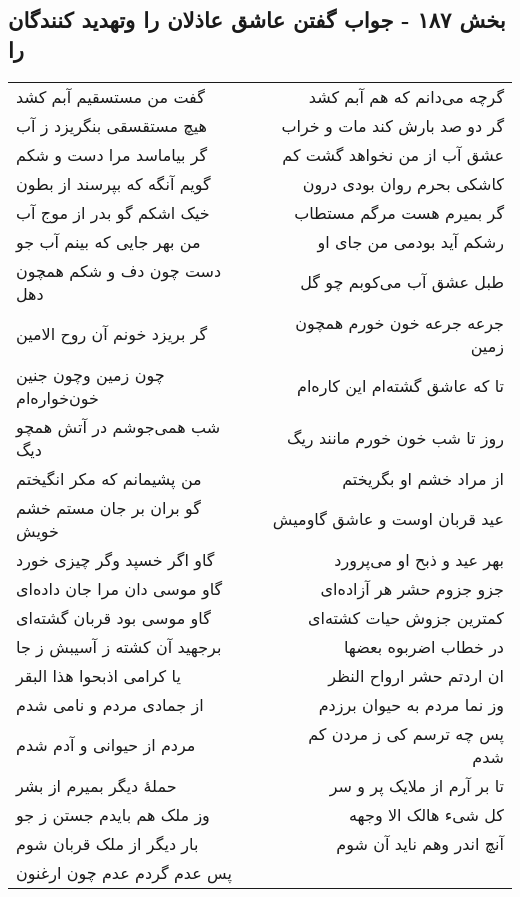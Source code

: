 \begin{center}
\section*{بخش ۱۸۷ - جواب گفتن عاشق عاذلان را وتهدید کنندگان را}
\label{sec:sh187}
\begin{longtable}{l p{0.5cm} r}
گفت من مستسقیم آبم کشد
&&
گرچه می‌دانم که هم آبم کشد
\\
هیچ مستقسقی بنگریزد ز آب
&&
گر دو صد بارش کند مات و خراب
\\
گر بیاماسد مرا دست و شکم
&&
عشق آب از من نخواهد گشت کم
\\
گویم آنگه که بپرسند از بطون
&&
کاشکی بحرم روان بودی درون
\\
خیک اشکم گو بدر از موج آب
&&
گر بمیرم هست مرگم مستطاب
\\
من بهر جایی که بینم آب جو
&&
رشکم آید بودمی من جای او
\\
دست چون دف و شکم همچون دهل
&&
طبل عشق آب می‌کوبم چو گل
\\
گر بریزد خونم آن روح الامین
&&
جرعه جرعه خون خورم همچون زمین
\\
چون زمین وچون جنین خون‌خواره‌ام
&&
تا که عاشق گشته‌ام این کاره‌ام
\\
شب همی‌جوشم در آتش همچو دیگ
&&
روز تا شب خون خورم مانند ریگ
\\
من پشیمانم که مکر انگیختم
&&
از مراد خشم او بگریختم
\\
گو بران بر جان مستم خشم خویش
&&
عید قربان اوست و عاشق گاومیش
\\
گاو اگر خسپد وگر چیزی خورد
&&
بهر عید و ذبح او می‌پرورد
\\
گاو موسی دان مرا جان داده‌ای
&&
جزو جزوم حشر هر آزاده‌ای
\\
گاو موسی بود قربان گشته‌ای
&&
کمترین جزوش حیات کشته‌ای
\\
برجهید آن کشته ز آسیبش ز جا
&&
در خطاب اضربوه بعضها
\\
یا کرامی اذبحوا هذا البقر
&&
ان اردتم حشر ارواح النظر
\\
از جمادی مردم و نامی شدم
&&
وز نما مردم به حیوان برزدم
\\
مردم از حیوانی و آدم شدم
&&
پس چه ترسم کی ز مردن کم شدم
\\
حملهٔ دیگر بمیرم از بشر
&&
تا بر آرم از ملایک پر و سر
\\
وز ملک هم بایدم جستن ز جو
&&
کل شیء هالک الا وجهه
\\
بار دیگر از ملک قربان شوم
&&
آنچ اندر وهم ناید آن شوم
\\
پس عدم گردم عدم چون ارغنون

\end{longtable}
\end{center}

